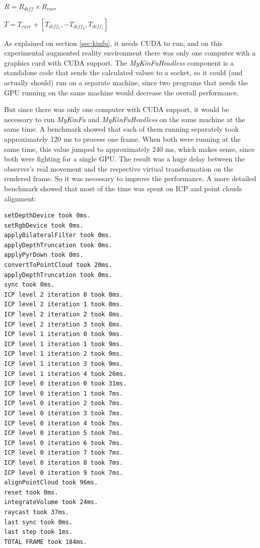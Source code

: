 \documentclass[msc, a4paper, classic, en]{ufbathesis}
\begin{document}
\begin{center}
$R = R_{diff} \times R_{curr}$
\end{center}

\begin{center}
$T = T_{curr} + [T_{diff_x}, -T_{diff_y}, T_{diff_z}]$
\end{center}

As explained on section \ref{sec:kinfu}, it needs CUDA to run, and on this experimental augmented reality environment there was only one computer with a graphics card with CUDA support. The \textit{MyKinFuHeadless} component is a standalone code that sends the calculated values to a socket, so it could (and actually should) run on a separate machine, since two programs that needs the GPU running on the same machine would decrease the overall performance.

But since there was only one computer with CUDA support, it would be necessary to run \textit{MyKinFu} and \textit{MyKinFuHeadless} on the same machine at the same time. A benchmark showed that each of them running separately took approximately 120 ms to process one frame. When both were running at the same time, this value jumped to approximately 240 ms, which makes sense, since both were fighting for a single GPU. The result was a huge delay between the observer's real movement and the respective virtual transformation on the rendered frame. So it was necessary to improve the performance. A more detailed benchmark showed that most of the time was spent on ICP and point clouds alignment:

\begin{verbatim}
setDepthDevice took 0ms.
setRgbDevice took 0ms.
applyBilateralFilter took 0ms.
applyDepthTruncation took 0ms.
applyPyrDown took 0ms.
convertToPointCloud took 20ms.
applyDepthTruncation took 0ms.
sync took 0ms.
ICP level 2 iteration 0 took 0ms.
ICP level 2 iteration 1 took 0ms.
ICP level 2 iteration 2 took 8ms.
ICP level 2 iteration 3 took 8ms.
ICP level 1 iteration 0 took 9ms.
ICP level 1 iteration 1 took 9ms.
ICP level 1 iteration 2 took 9ms.
ICP level 1 iteration 3 took 9ms.
ICP level 1 iteration 4 took 26ms.
ICP level 0 iteration 0 took 31ms.
ICP level 0 iteration 1 took 7ms.
ICP level 0 iteration 2 took 7ms.
ICP level 0 iteration 3 took 7ms.
ICP level 0 iteration 4 took 7ms.
ICP level 0 iteration 5 took 7ms.
ICP level 0 iteration 6 took 7ms.
ICP level 0 iteration 7 took 7ms.
ICP level 0 iteration 8 took 7ms.
ICP level 0 iteration 9 took 7ms.
alignPointCloud took 96ms.
reset took 0ms.
integrateVolume took 24ms.
raycast took 37ms.
last sync took 0ms.
last step took 1ms.
TOTAL FRAME took 184ms.
\end{verbatim}
\end{document}
